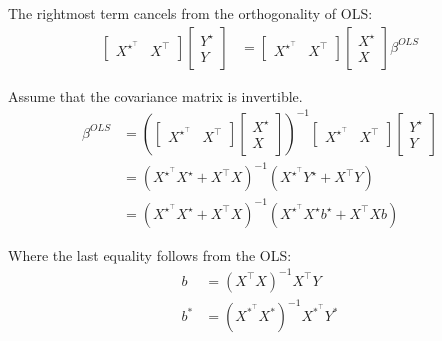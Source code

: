 \documentclass{article}
\begin{document}
The rightmost term cancels from the orthogonality of OLS:
\begin{align*}
        \begin{bmatrix}
            X^\star^\intercal & X^\intercal
        \end{bmatrix}  \begin{bmatrix}
    Y^\star \\ Y
    \end{bmatrix} &=         \begin{bmatrix}
            X^\star ^\intercal& X^\intercal
        \end{bmatrix} \begin{bmatrix}
    X^\star \\ X
    \end{bmatrix}\beta^{OLS} 
\end{align*}

Assume that the covariance matrix is invertible.
    \begin{align*}
        \beta^{OLS} &=  \left(\begin{bmatrix}
            X^\star ^\intercal& X^\intercal
        \end{bmatrix} \begin{bmatrix}
    X^\star \\ X
    \end{bmatrix}\right)^{-1}   \begin{bmatrix}
            X^\star^\intercal & X^\intercal
        \end{bmatrix}  \begin{bmatrix}
    Y^\star \\ Y
    \end{bmatrix} \\
    &= \left(X^\star^\intercal X^\star + X^\intercal X\right)^{-1}\left(X^\star^\intercal Y^\star + X^\intercal Y\right) \\
    &= \left(X^\star^\intercal X^\star + X^\intercal X\right)^{-1}\left(X^\star^\intercal X^\star b^\star + X^\intercal Xb\right)
\end{align*}
    
Where the last equality follows from the OLS:
    \begin{align*}
        b &= \left(X^\intercal X\right)^{-1}X^\intercal Y \\
        b^\ast &= \left(X^\ast^\intercal X^\ast\right)^{-1}X^\ast^\intercal Y^\ast 
    \end{align*}


\end{document}
